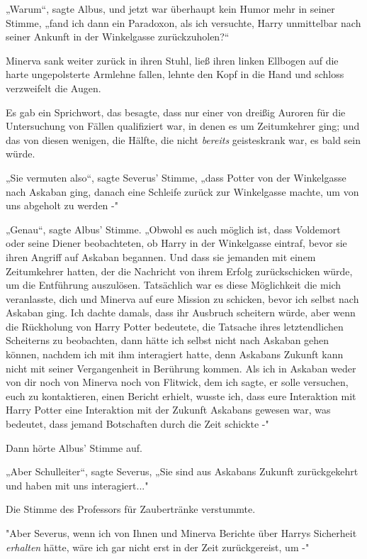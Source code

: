{„Warum“, sagte Albus, und jetzt war überhaupt kein Humor mehr in seiner Stimme, „fand ich dann ein Paradoxon, als ich versuchte, Harry unmittelbar nach seiner Ankunft in der Winkelgasse zurückzuholen?“

Minerva sank weiter zurück in ihren Stuhl, ließ ihren linken Ellbogen auf die harte ungepolsterte Armlehne fallen, lehnte den Kopf in die Hand und schloss verzweifelt die Augen.

Es gab ein Sprichwort, das besagte, dass nur einer von dreißig Auroren für die Untersuchung von Fällen qualifiziert war, in denen es um Zeitumkehrer ging; und das von diesen wenigen, die Hälfte, die nicht \emph{bereits} geisteskrank war, es bald sein würde.

„Sie vermuten also“, sagte Severus' Stimme, „dass Potter von der Winkelgasse nach Askaban ging, danach eine Schleife zurück zur Winkelgasse machte, um von uns abgeholt zu werden -"

„Genau“, sagte Albus' Stimme. „Obwohl es auch möglich ist, dass Voldemort oder seine Diener beobachteten, ob Harry in der Winkelgasse eintraf, bevor sie ihren Angriff auf Askaban begannen. Und dass sie jemanden mit einem Zeitumkehrer hatten, der die Nachricht von ihrem Erfolg zurückschicken würde, um die Entführung auszulösen. Tatsächlich war es diese Möglichkeit die mich veranlasste, dich und Minerva auf eure Mission zu schicken, bevor ich selbst nach Askaban ging. Ich dachte damals, dass ihr Ausbruch scheitern würde, aber wenn die Rückholung von Harry Potter bedeutete, die Tatsache ihres letztendlichen Scheiterns zu beobachten, dann hätte ich selbst nicht nach Askaban gehen können, nachdem ich mit ihm interagiert hatte, denn Askabans Zukunft kann nicht mit seiner Vergangenheit in Berührung kommen. Als ich in Askaban weder von dir noch von Minerva noch von Flitwick, dem ich sagte, er solle versuchen, euch zu kontaktieren, einen Bericht erhielt, wusste ich, dass eure Interaktion mit Harry Potter eine Interaktion mit der Zukunft Askabans gewesen war, was bedeutet, dass jemand Botschaften durch die Zeit schickte -"

Dann hörte Albus' Stimme auf.

„Aber Schulleiter“, sagte Severus, „Sie sind aus Askabans Zukunft zurückgekehrt und haben mit uns interagiert..."

Die Stimme des Professors für Zaubertränke verstummte.

"Aber Severus, wenn ich von Ihnen und Minerva Berichte über Harrys Sicherheit \emph{erhalten} hätte, wäre ich gar nicht erst in der Zeit zurückgereist, um -"

}
